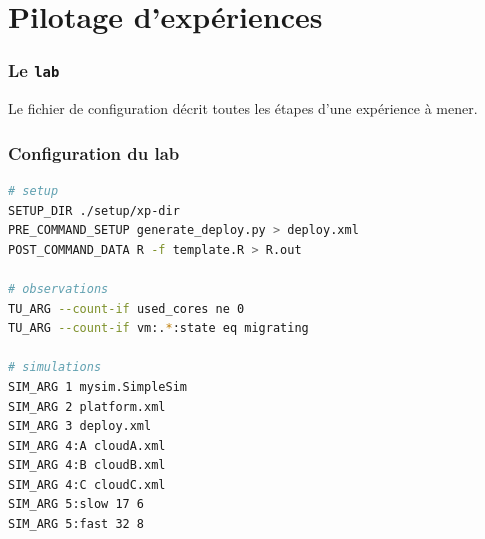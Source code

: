 \documentclass{beamer}
\newcommand{\lab}{\texttt{lab}}
\begin{document}
\section{Pilotage d'expériences}

\begin{frame}
	\frametitle{Le \lab}
	\resizebox{\textwidth}{!}{}
	Le fichier de configuration décrit toutes les étapes d'une expérience à
	mener.
\end{frame}

\begin{frame}[fragile]
	\frametitle{Configuration du lab}
\begin{lstlisting}[language=bash,basicstyle=\tt\footnotesize,backgroundcolor=\color{gray!10},
morekeywords={SETUP_DIR,TU_ARG,PRE_COMMAND_SETUP,POST_COMMAND_DATA,SIM_ARG},
keywordstyle=\color{red!90},commentstyle=\color{blue!70}]
# setup
SETUP_DIR ./setup/xp-dir
PRE_COMMAND_SETUP generate_deploy.py > deploy.xml
POST_COMMAND_DATA R -f template.R > R.out

# observations
TU_ARG --count-if used_cores ne 0
TU_ARG --count-if vm:.*:state eq migrating

# simulations
SIM_ARG 1 mysim.SimpleSim
SIM_ARG 2 platform.xml 
SIM_ARG 3 deploy.xml
SIM_ARG 4:A cloudA.xml
SIM_ARG 4:B cloudB.xml 
SIM_ARG 4:C cloudC.xml
SIM_ARG 5:slow 17 6
SIM_ARG 5:fast 32 8
\end{lstlisting}
\end{frame}
\end{document}
